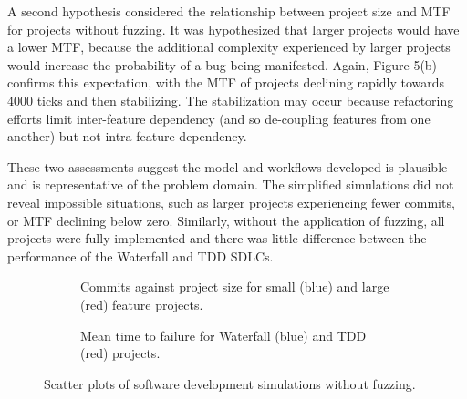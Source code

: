 \documentclass{llncs}
\begin{document}
A second hypothesis considered the relationship between project size and MTF for projects without fuzzing. It was
hypothesized that larger projects would have a lower MTF, because the additional complexity experienced by larger
projects would increase the probability of a bug being manifested.  Again, Figure 5(b) confirms this expectation, with
the MTF of projects declining rapidly towards 4000 ticks and then stabilizing.  The stabilization may occur because
refactoring efforts limit inter-feature dependency (and so de-coupling features from one another) but not intra-feature
dependency.

These two assessments suggest the model and workflows developed is plausible and is representative of the problem
domain.  The simplified simulations did not reveal impossible situations, such as larger projects experiencing fewer
commits, or MTF declining below zero.  Similarly, without the application of fuzzing, all projects were fully
implemented and there was little difference between the performance of the Waterfall and TDD SDLCs.

 


\begin{figure}
  \centering

  \begin{subfigure}{2.3in}
    \caption{Commits against project size for small (blue) and large (red) feature projects.}
  \end{subfigure}
  \hfill
  \begin{subfigure}{2.3in}
    \caption{Mean time to failure for Waterfall (blue) and TDD (red) projects.}  
  \end{subfigure}
  
  \caption{Scatter plots of software development simulations without fuzzing.}
  \label{fig:no-fuzzing}
\end{figure}
\end{document}
